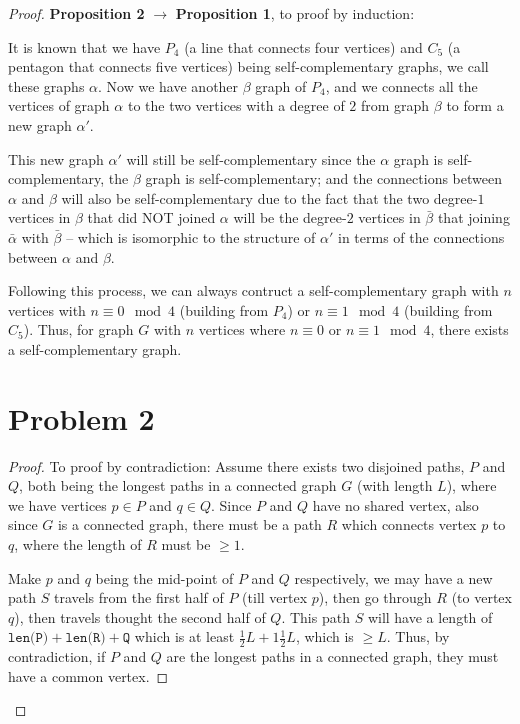 \documentclass[12pt]{article}
\newcommand{\ilc}{\texttt}
\begin{document}
\begin{proof}
\textbf{Proposition 2} $\longrightarrow$ \textbf{Proposition 1}, to proof by induction:\newline

It is known that we have $P_4$ (a line that connects four vertices) and $C_5$ (a pentagon that connects five vertices) being self-complementary graphs, we call these graphs $\alpha$. Now we have another $\beta$ graph of $P_4$, and we connects all the vertices of graph $\alpha$ to the two vertices with a degree of $2$ from graph $\beta$ to form a new graph $\alpha'$.

This new graph $\alpha'$ will still be self-complementary since the $\alpha$ graph is self-complementary, the $\beta$ graph is self-complementary; and the connections between $\alpha$ and $\beta$ will also be self-complementary due to the fact that the two degree-$1$ vertices in $\beta$ that did NOT joined $\alpha$ will be the degree-$2$ vertices in $\bar{\beta}$ that joining $\bar{\alpha}$ with $\bar{\beta}$ -- which is isomorphic to the structure of $\alpha'$ in terms of the connections between $\alpha$ and $\beta$.\newline

Following this process, we can always contruct a self-complementary graph with $n$ vertices with $n \equiv 0 \mod 4$ (building from $P_4$)  or $n \equiv 1 \mod 4$ (building from $C_5$). Thus, for graph $G$ with $n$ vertices where $n \equiv 0$ or $n \equiv 1 \mod 4$, there exists a self-complementary graph.
\section{Problem 2}

\begin{proof}
To proof by contradiction:\newline
Assume there exists two disjoined paths, $P$ and $Q$, both being the longest paths in a connected graph $G$ (with length $L$), where we have vertices $p \in P$ and $q \in Q$. Since $P$ and $Q$ have no shared vertex, also since $G$ is a connected graph, there must be a path $R$ which connects vertex $p$ to $q$, where the length of $R$ must be $\geq 1$.

Make $p$ and $q$ being the mid-point of $P$ and $Q$ respectively, we may have a new path $S$ travels from the first half of $P$ (till vertex $p$), then go through $R$ (to vertex $q$), then travels thought the second half of $Q$. This path $S$ will have a length of $\ilc{len(P)} + \ilc{len(R)} + \ilc{Q}$ which is at least $\frac{1}{2}L + 1 \frac{1}{2}L$, which is $\geq L$. Thus, by contradiction, if $P$ and $Q$ are the longest paths in a connected graph, they must have a common vertex.



\end{proof}
\end{proof}
\end{document}
